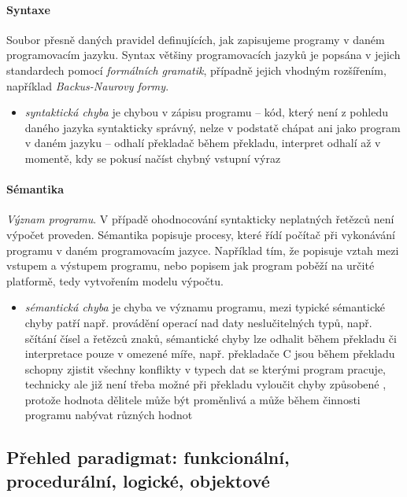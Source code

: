 \documentclass[10pt,a4paper]{article}
\begin{document}
    \paragraph{Syntaxe}
    Soubor přesně daných pravidel definujících, jak zapisujeme programy v daném programovacím jazyku. Syntax většiny programovacích jazyků je popsána v jejich standardech pomocí \textit{formálních gramatik}, případně jejich vhodným rozšířením, například \textit{Backus-Naurovy formy}.
    \begin{itemize}
      \item \textit{syntaktická chyba} je chybou v zápisu programu -- kód, který není z pohledu daného jazyka syntakticky správný, nelze v podstatě chápat ani jako program v daném jazyku -- odhalí překladač během překladu, interpret odhalí až v momentě, kdy se pokusí načíst chybný vstupní výraz
    \end{itemize}
    \paragraph{Sémantika}
      \textit{Význam programu}. V případě ohodnocování syntakticky neplatných řetězců není výpočet proveden. Sémantika popisuje procesy, které řídí počítač při vykonávání programu v daném programovacím jazyce. Například tím, že popisuje vztah mezi vstupem a výstupem programu, nebo popisem jak program poběží na určité platformě, tedy vytvořením modelu výpočtu.
      \begin{itemize}
        \item \textit{sémantická chyba} je chyba ve významu programu, mezi typické sémantické chyby patří např. provádění operací nad daty neslučitelných typů, např. sčítání čísel a řetězců znaků, sémantické chyby lze odhalit během překladu či interpretace pouze v omezené míře, např. překladače C jsou během překladu schopny zjistit všechny konflikty v typech dat se kterými program pracuje, technicky ale již není třeba možné při překladu vyloučit chyby způsobené , protože hodnota dělitele může být proměnlivá a může během činnosti programu nabývat různých hodnot
      \end{itemize}
  \subsection{Přehled paradigmat: funkcionální, procedurální, logické, objektové}
\end{document}
